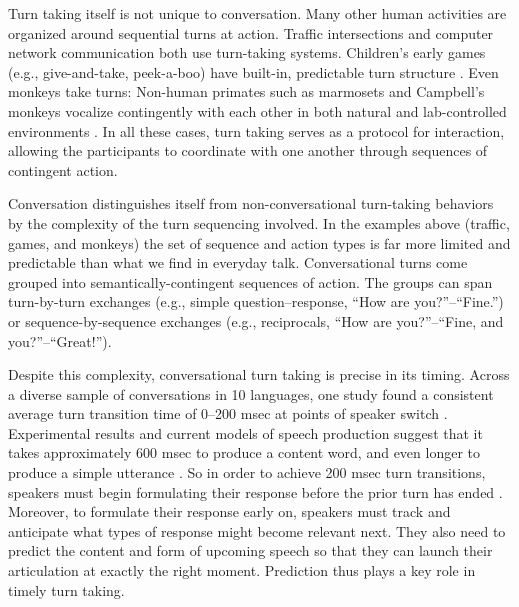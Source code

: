 \documentclass[authoryear, 12pt]{elsarticle}
\begin{document}
Turn taking itself is not unique to conversation. Many other human activities are organized around sequential turns at action. Traffic intersections and computer network communication both use turn-taking systems. Children's early games (e.g., give-and-take, peek-a-boo) have built-in, predictable turn structure \citep{ratner1978, ross1987}. Even monkeys take turns: Non-human primates such as marmosets and Campbell's monkeys vocalize contingently with each other in both natural and lab-controlled environments \citep{lemasson2011, takahashi2013}. In all these cases, turn taking serves as a protocol for interaction, allowing the participants to coordinate with one another through sequences of contingent action. 

Conversation distinguishes itself from non-conversational turn-taking behaviors by the complexity of the turn sequencing involved. In the examples above (traffic, games, and monkeys) the set of sequence and action types is far more limited and predictable than what we find in everyday talk. Conversational turns come grouped into semantically-contingent sequences of action. The groups can span turn-by-turn exchanges (e.g., simple question--response, ``How are you?''--``Fine.'') or sequence-by-sequence exchanges (e.g., reciprocals, ``How are you?''--``Fine, and you?''--``Great!''). 


Despite this complexity, conversational turn taking is precise in its timing. Across a diverse sample of conversations in 10 languages, one study found a consistent average turn transition time of 0--200 msec at points of speaker switch \citep{stivers2009}. Experimental results and current models of speech production suggest that it takes approximately 600 msec to produce a content word, and even longer to produce a simple utterance \citep{griffin2000, levelt1989}. So in order to achieve 200 msec turn transitions, speakers must begin formulating their response before the prior turn has ended \citep{levinson2013}. Moreover, to formulate their response early on, speakers must track and anticipate what types of response might become relevant next. They also need to predict the content and form of upcoming speech so that they can launch their articulation at exactly the right moment. Prediction thus plays a key role in timely turn taking.
\end{document}
